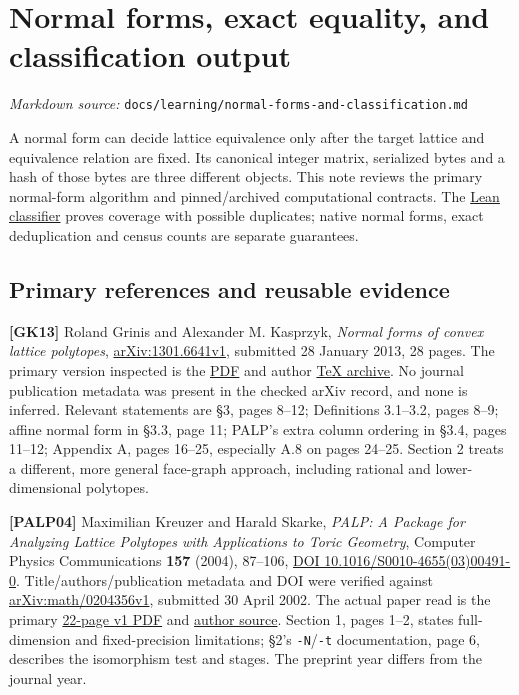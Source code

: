 \documentclass[11pt,a4paper,oneside]{report}
\begin{document}
\chapter{Normal forms, exact equality, and classification
output}\label{normal-forms-and-classification--normal-forms-exact-equality-and-classification-output}

\noindent\textit{Markdown source: }\texttt{docs/\allowbreak{}learning\allowbreak{}/\allowbreak{}normal-\allowbreak{}forms-\allowbreak{}and-\allowbreak{}classifi\allowbreak{}cation.\allowbreak{}md}

A normal form can decide lattice equivalence only after the target
lattice and equivalence relation are fixed. Its canonical integer
matrix, serialized bytes and a hash of those bytes are three different
objects. This note reviews the primary normal-form algorithm and
pinned/archived computational contracts. The
\href{../../proofs/STATEMENTS.md}{Lean classifier} proves coverage with
possible duplicates; native normal forms, exact deduplication and census
counts are separate guarantees.

\section{Primary references and reusable
evidence}\label{normal-forms-and-classification--primary-references-and-reusable-evidence}

\textbf{{[}GK13{]}} Roland Grinis and Alexander M. Kasprzyk,
\emph{Normal forms of convex lattice polytopes},
\href{https://arxiv.org/abs/1301.6641v1}{arXiv:\allowbreak{}1301.\allowbreak{}6641v1},
submitted 28 January 2013, 28 pages. The primary version inspected is
the \href{https://arxiv.org/pdf/1301.6641v1}{PDF} and author
\href{https://arxiv.org/src/1301.6641v1}{TeX archive}. No journal
publication metadata was present in the checked arXiv record, and none
is inferred. Relevant statements are §3, pages 8--12; Definitions
3.1--3.2, pages 8--9; affine normal form in §3.3, page 11; PALP's extra
column ordering in §3.4, pages 11--12; Appendix A, pages 16--25,
especially A.8 on pages 24--25. Section 2 treats a different, more
general face-graph approach, including rational and lower-dimensional
polytopes.

\textbf{{[}PALP04{]}} Maximilian Kreuzer and Harald Skarke, \emph{PALP:
A Package for Analyzing Lattice Polytopes with Applications to Toric
Geometry}, Computer Physics Communications \textbf{157} (2004), 87--106,
\href{https://doi.org/10.1016/S0010-4655\%2803\%2900491-0}{DOI
10.\allowbreak{}1016/\allowbreak{}S0010-\allowbreak{}4655(\allowbreak{}03)\allowbreak{}00491-\allowbreak{}0}.
Title/authors/publication metadata and DOI were verified against
\href{https://arxiv.org/abs/math/0204356v1}{arXiv:\allowbreak{}math/\allowbreak{}0204356v\allowbreak{}1},
submitted 30 April 2002. The actual paper read is the primary
\href{https://arxiv.org/pdf/math/0204356v1}{22-page v1 PDF} and
\href{https://arxiv.org/src/math/0204356v1}{author source}. Section 1,
pages 1--2, states full-dimension and fixed-precision limitations; §2's
\texttt{-\allowbreak{}N}/\texttt{-\allowbreak{}t} documentation, page 6,
describes the isomorphism test and stages. The preprint year differs
from the journal year.
\end{document}
